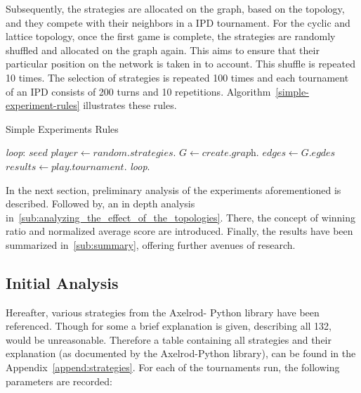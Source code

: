 Subsequently, the strategies are allocated on the graph, based
on the topology, and they compete with their neighbors in a IPD tournament.
For the cyclic and lattice topology, once the first game is complete,
the strategies are randomly shuffled and allocated on the graph again. This aims
to ensure that their particular position on the network is taken in to account.
This shuffle is repeated 10 times. The selection of strategies is repeated 100 times
and each tournament of an IPD consists of 200 turns and 10 repetitions.
Algorithm~\ref{simple-experiment-rules} illustrates these rules.

\begin{algorithm}
	\caption{Simple Experiments Rules}\label{simple-experiment-rules}
	\begin{algorithmic}
		\BState \emph{loop}:
		\State $seed$ 
		\State $player \gets \textit{random.strategies}$.
		\State $G \gets \textit{create.graph}$.
		\State $edges \gets \textit{G.egdes}$
		\State $results \gets \textit{play.tournament}$.
		\emph{loop}.
		\EndFor
		\EndFor
		\EndProcedure
	\end{algorithmic}
\end{algorithm}

In the next section, preliminary analysis of the experiments aforementioned
is described. Followed by, an in depth analysis in~\autoref{sub:analyzing_the_effect_of_the_topologies}.
There, the concept of winning ratio and normalized average score are introduced.
Finally, the results have been summarized in~\autoref{sub:summary}, offering further
avenues of research.

\subsection{Initial Analysis}
\label{sub:initial_analysis}
Hereafter, various strategies from the Axelrod- Python library have been referenced.
Though for some a brief explanation is given, describing all 132, would be
unreasonable. Therefore a table containing all strategies and their explanation
(as documented by the Axelrod-Python library), can be found in the Appendix~\ref{append:strategies}.
For each of the tournaments run, the following parameters are recorded:


